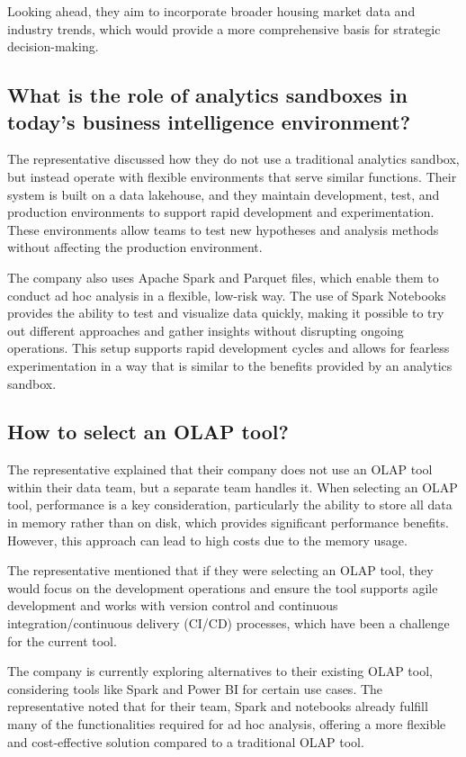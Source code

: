 Looking ahead, they aim to incorporate broader housing market data and industry trends, which would provide a more comprehensive basis 
for strategic decision-making.

\subsection{What is the role of analytics sandboxes in today's business intelligence environment?} 

The representative discussed how they do not use a traditional analytics sandbox, but instead operate with flexible environments that 
serve similar functions. Their system is built on a data lakehouse, and they maintain development, test, and production environments 
to support rapid development and experimentation. These environments allow teams to test new hypotheses and analysis methods without 
affecting the production environment.

The company also uses Apache Spark and Parquet files, which enable them to conduct ad hoc analysis in a flexible, low-risk way. The 
use of Spark Notebooks provides the ability to test and visualize data quickly, making it possible to try out different approaches and 
gather insights without disrupting ongoing operations. This setup supports rapid development cycles and allows for fearless experimentation 
in a way that is similar to the benefits provided by an analytics sandbox.

\subsection{How to select an OLAP tool?}

The representative explained that their company does not use an OLAP tool within their data team, but a separate team handles it. When 
selecting an OLAP tool, performance is a key consideration, particularly the ability to store all data in memory rather than on disk, which 
provides significant performance benefits. However, this approach can lead to high costs due to the memory usage.

The representative mentioned that if they were selecting an OLAP tool, they would focus on the development operations and ensure the tool 
supports agile development and works with version control and continuous integration/continuous delivery (CI/CD) processes, which have been 
a challenge for the current tool.

The company is currently exploring alternatives to their existing OLAP tool, considering tools like Spark and Power BI for certain use cases. 
The representative noted that for their team, Spark and notebooks already fulfill many of the functionalities required for ad hoc analysis, 
offering a more flexible and cost-effective solution compared to a traditional OLAP tool.







